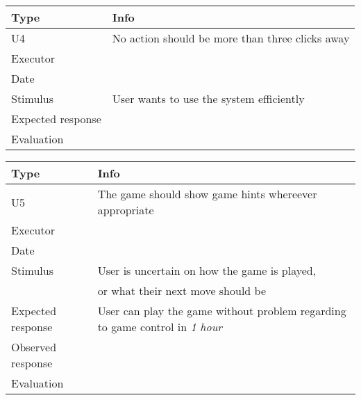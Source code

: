 \vspace{0.5em}

\noindent
\begin{tabular}{|p{3cm}|p{8.5cm}|}
	\hline
	\bf{Type}	& \bf{Info} \\
	\hline
	U4			& No action should be more than three clicks away \\
	Executor	&  \\
	Date		& \date{\today} \\
	Stimulus	& User wants to use the system efficiently \\
	Expected response &  \\
	Evaluation	&  \\
	\hline
\end{tabular}

\vspace{0.5em}

\noindent
\begin{tabular}{|p{3cm}|p{8.5cm}|}
	\hline
	\bf{Type}	& \bf{Info} \\
	\hline
	U5			& The game should show game hints whereever appropriate \\
	Executor	&  \\
	Date		& \date{\today} \\
	Stimulus	& User is uncertain on how the game is played, \\
             & or what their next move should be \\
	Expected response & User can play the game without problem regarding to game control in \emph{1 hour}\\
	Observed response & \\
	Evaluation	&  \\
	\hline
\end{tabular}
